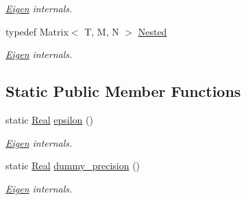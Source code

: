 \begin{DoxyCompactItemize}
\begin{DoxyCompactList}\small\item\em \hyperlink{namespace_eigen}{Eigen} internals. \end{DoxyCompactList}\item 
\hypertarget{struct_eigen_1_1_num_traits_3_01_matrix_3_01_t_00_01_m_00_01_n_01_4_01_4_a48b4a05e97dd1a7811db53a0a94befdf}{typedef Matrix$<$ T, M, N $>$ \hyperlink{struct_eigen_1_1_num_traits_3_01_matrix_3_01_t_00_01_m_00_01_n_01_4_01_4_a48b4a05e97dd1a7811db53a0a94befdf}{Nested}}\label{struct_eigen_1_1_num_traits_3_01_matrix_3_01_t_00_01_m_00_01_n_01_4_01_4_a48b4a05e97dd1a7811db53a0a94befdf}

\begin{DoxyCompactList}\small\item\em \hyperlink{namespace_eigen}{Eigen} internals. \end{DoxyCompactList}\end{DoxyCompactItemize}
\subsection*{Static Public Member Functions}
\begin{DoxyCompactItemize}
\item 
\hypertarget{struct_eigen_1_1_num_traits_3_01_matrix_3_01_t_00_01_m_00_01_n_01_4_01_4_a34a0f20cd593faa04bf2c821272ab5c1}{static \hyperlink{struct_eigen_1_1_num_traits_3_01_matrix_3_01_t_00_01_m_00_01_n_01_4_01_4_a1a60db4703bbefdac9f214dae8fa427c}{Real} \hyperlink{struct_eigen_1_1_num_traits_3_01_matrix_3_01_t_00_01_m_00_01_n_01_4_01_4_a34a0f20cd593faa04bf2c821272ab5c1}{epsilon} ()}\label{struct_eigen_1_1_num_traits_3_01_matrix_3_01_t_00_01_m_00_01_n_01_4_01_4_a34a0f20cd593faa04bf2c821272ab5c1}

\begin{DoxyCompactList}\small\item\em \hyperlink{namespace_eigen}{Eigen} internals. \end{DoxyCompactList}\item 
\hypertarget{struct_eigen_1_1_num_traits_3_01_matrix_3_01_t_00_01_m_00_01_n_01_4_01_4_a60607af8d805c2d0c7963e89128070fc}{static \hyperlink{struct_eigen_1_1_num_traits_3_01_matrix_3_01_t_00_01_m_00_01_n_01_4_01_4_a1a60db4703bbefdac9f214dae8fa427c}{Real} \hyperlink{struct_eigen_1_1_num_traits_3_01_matrix_3_01_t_00_01_m_00_01_n_01_4_01_4_a60607af8d805c2d0c7963e89128070fc}{dummy\-\_\-precision} ()}\label{struct_eigen_1_1_num_traits_3_01_matrix_3_01_t_00_01_m_00_01_n_01_4_01_4_a60607af8d805c2d0c7963e89128070fc}

\begin{DoxyCompactList}\small\item\em \hyperlink{namespace_eigen}{Eigen} internals. \end{DoxyCompactList}\end{DoxyCompactItemize}


